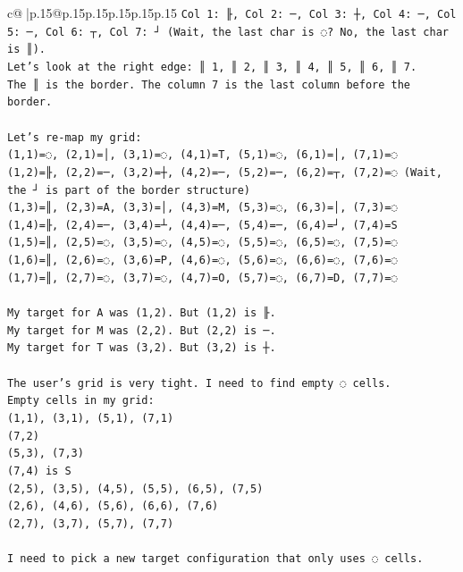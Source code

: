 \documentclass{article}
\begin{document}
{\begin{supertabular}{c@{$\;$}|p{.15\linewidth}@{}p{.15\linewidth}p{.15\linewidth}p{.15\linewidth}p{.15\linewidth}p{.15\linewidth}}
{{{\texttt{Col 1: ╟, Col 2: ─, Col 3: ┼, Col 4: ─, Col 5: ─, Col 6: ┬, Col 7: ┘ (Wait, the last char is ◌? No, the last char is ║).} \\
\texttt{Let's look at the right edge: ║ 1, ║ 2, ║ 3, ║ 4, ║ 5, ║ 6, ║ 7.} \\
\texttt{The ║ is the border. The column 7 is the last column before the border.} \\
\\ 
\texttt{Let's re{-}map my grid:} \\
\texttt{(1,1)=◌, (2,1)=│, (3,1)=◌, (4,1)=T, (5,1)=◌, (6,1)=│, (7,1)=◌} \\
\texttt{(1,2)=╟, (2,2)=─, (3,2)=┼, (4,2)=─, (5,2)=─, (6,2)=┬, (7,2)=◌ (Wait, the ┘ is part of the border structure)} \\
\texttt{(1,3)=║, (2,3)=A, (3,3)=│, (4,3)=M, (5,3)=◌, (6,3)=│, (7,3)=◌} \\
\texttt{(1,4)=╟, (2,4)=─, (3,4)=┴, (4,4)=─, (5,4)=─, (6,4)=┘, (7,4)=S} \\
\texttt{(1,5)=║, (2,5)=◌, (3,5)=◌, (4,5)=◌, (5,5)=◌, (6,5)=◌, (7,5)=◌} \\
\texttt{(1,6)=║, (2,6)=◌, (3,6)=P, (4,6)=◌, (5,6)=◌, (6,6)=◌, (7,6)=◌} \\
\texttt{(1,7)=║, (2,7)=◌, (3,7)=◌, (4,7)=O, (5,7)=◌, (6,7)=D, (7,7)=◌} \\
\\ 
\texttt{My target for A was (1,2). But (1,2) is ╟.} \\
\texttt{My target for M was (2,2). But (2,2) is ─.} \\
\texttt{My target for T was (3,2). But (3,2) is ┼.} \\
\\ 
\texttt{The user's grid is very tight. I need to find empty ◌ cells.} \\
\texttt{Empty cells in my grid:} \\
\texttt{(1,1), (3,1), (5,1), (7,1)} \\
\texttt{(7,2)} \\
\texttt{(5,3), (7,3)} \\
\texttt{(7,4) is S} \\
\texttt{(2,5), (3,5), (4,5), (5,5), (6,5), (7,5)} \\
\texttt{(2,6), (4,6), (5,6), (6,6), (7,6)} \\
\texttt{(2,7), (3,7), (5,7), (7,7)} \\
\\ 
\texttt{I need to pick a new target configuration that only uses ◌ cells.} \\
}}}
\end{supertabular}}
\end{document}

